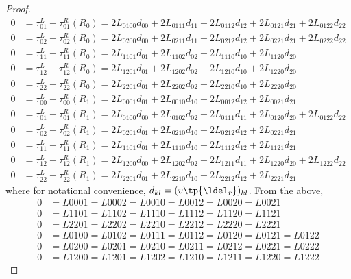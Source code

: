 \begin{proof}
\begin{align}
        0 &= \tau^L_{01} - \tau^R_{01}(R_0) = 2L_{0100}d_{00} + 2L_{0111}d_{11} + 2L_{0112}d_{12} + 2L_{0121}d_{21} + 2L_{0122}d_{22} \\
        0 &= \tau^L_{02} - \tau^R_{02}(R_0) = 2L_{0200}d_{00} + 2L_{0211}d_{11} + 2L_{0212}d_{12} + 2L_{0221}d_{21} + 2L_{0222}d_{22} \\
        0 &= \tau^L_{11} - \tau^R_{11}(R_0) = 2L_{1101}d_{01} + 2L_{1102}d_{02} + 2L_{1110}d_{10} + 2L_{1120}d_{20} \\
        0 &= \tau^L_{12} - \tau^R_{12}(R_0) = 2L_{1201}d_{01} + 2L_{1202}d_{02} + 2L_{1210}d_{10} + 2L_{1220}d_{20} \\
        0 &= \tau^L_{22} - \tau^R_{22}(R_0) = 2L_{2201}d_{01} + 2L_{2202}d_{02} + 2L_{2210}d_{10} + 2L_{2220}d_{20} \\
        0 &= \tau^L_{00} - \tau^R_{00}(R_1) = 2L_{0001}d_{01} + 2L_{0010}d_{10} + 2L_{0012}d_{12} + 2L_{0021}d_{21} \\
        0 &= \tau^L_{01} - \tau^R_{01}(R_1) = 2L_{0100}d_{00} + 2L_{0102}d_{02} + 2L_{0111}d_{11} + 2L_{0120}d_{20} + 2L_{0122}d_{22} \\
        0 &= \tau^L_{02} - \tau^R_{02}(R_1) = 2L_{0201}d_{01} + 2L_{0210}d_{10} + 2L_{0212}d_{12} + 2L_{0221}d_{21} \\
        0 &= \tau^L_{11} - \tau^R_{11}(R_1) = 2L_{1101}d_{01} + 2L_{1110}d_{10} + 2L_{1112}d_{12} + 2L_{1121}d_{21} \\
        0 &= \tau^L_{12} - \tau^R_{12}(R_1) = 2L_{1200}d_{00} + 2L_{1202}d_{02} + 2L_{1211}d_{11} + 2L_{1220}d_{20} + 2L_{1222}d_{22} \\
        0 &= \tau^L_{22} - \tau^R_{22}(R_1) = 2L_{2201}d_{01} + 2L_{2210}d_{10} + 2L_{2212}d_{12} + 2L_{2221}d_{21}
    \end{align}
    where for notational convenience, $d_{kl}=(v\tp{\ldel_r})_{kl}$.  From the above,
    \begin{align}
        0 &= L0001 = L0002 = L0010 = L0012 = L0020 = L0021 \\
        0 &= L1101 = L1102 = L1110 = L1112 = L1120 = L1121 \\
        0 &= L2201 = L2202 = L2210 = L2212 = L2220 = L2221 \\
        0 &= L0100 = L0102 = L0111 = L0112 = L0120 = L0121 = L0122 \\
        0 &= L0200 = L0201 = L0210 = L0211 = L0212 = L0221 = L0222 \\
        0 &= L1200 = L1201 = L1202 = L1210 = L1211 = L1220 = L1222
    \end{align}

\end{proof}

